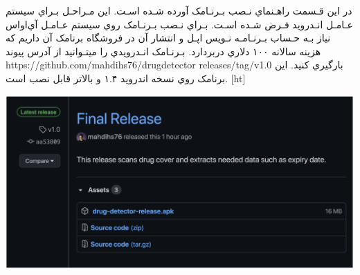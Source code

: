 


در این قـسمت راهـنماي نـصب بـرنـامک آورده شـده اسـت. این مـراحـل بـراي سیستم عـامـل انـدروید فـرض شـده اسـت. بـراي نـصب بـرنـامک روي سیستم عـامـل آي‌اواس نیاز بـه حـساب بـرنـامـه نـویس اپـل و انتشار آن در فروشگاه برنامک آن داریم که هزینه سالانه ۱۰۰ دلاري دربردارد.
\newline
بـرنـامک انـدرویدي را میتـوانید از آدرس پیوند https://github.com/mahdihs76/drugdetector releases/tag/v1.0 بارگیري کنید. این برنامک روي نسخه اندروید ۱.۴ و بالاتر قابل نصب است.
\newline
{}[ht]
\begin{center}
\includegraphics[scale=0.5]{front/template/images/release.png}
\end{center}



